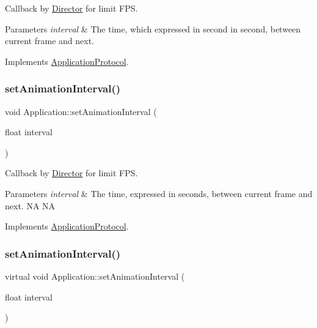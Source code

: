 Callback by \hyperlink{classDirector}{Director} for limit F\+PS. 


\begin{DoxyParams}{Parameters}
{\em interval} & The time, which expressed in second in second, between current frame and next. \\
\hline
\end{DoxyParams}


Implements \hyperlink{classApplicationProtocol_ac69ac0f01aaba7cc8654ec7cce4eb88f}{Application\+Protocol}.

\mbox{\label{classApplication_a3160c4ee81ef7fba87d7299991998d5b}} 
\subsubsection{\texorpdfstring{set\+Animation\+Interval()}{setAnimationInterval()}\hspace{0.1cm}{\footnotesize\ttfamily [8/12]}}
{\footnotesize\ttfamily void Application\+::set\+Animation\+Interval (\begin{DoxyParamCaption}\item[{float}]{interval }\end{DoxyParamCaption})\hspace{0.3cm}{\ttfamily [virtual]}}



Callback by \hyperlink{classDirector}{Director} for limit F\+PS. 


\begin{DoxyParams}{Parameters}
{\em interval} & The time, expressed in seconds, between current frame and next.  NA  NA \\
\hline
\end{DoxyParams}


Implements \hyperlink{classApplicationProtocol_ac69ac0f01aaba7cc8654ec7cce4eb88f}{Application\+Protocol}.

\mbox{\label{classApplication_a1b5b44a0013466855dce330a517885c3}} 
\subsubsection{\texorpdfstring{set\+Animation\+Interval()}{setAnimationInterval()}\hspace{0.1cm}{\footnotesize\ttfamily [9/12]}}
{\footnotesize\ttfamily virtual void Application\+::set\+Animation\+Interval (\begin{DoxyParamCaption}\item[{float}]{interval }\end{DoxyParamCaption})\hspace{0.3cm}{\ttfamily [virtual]}}



